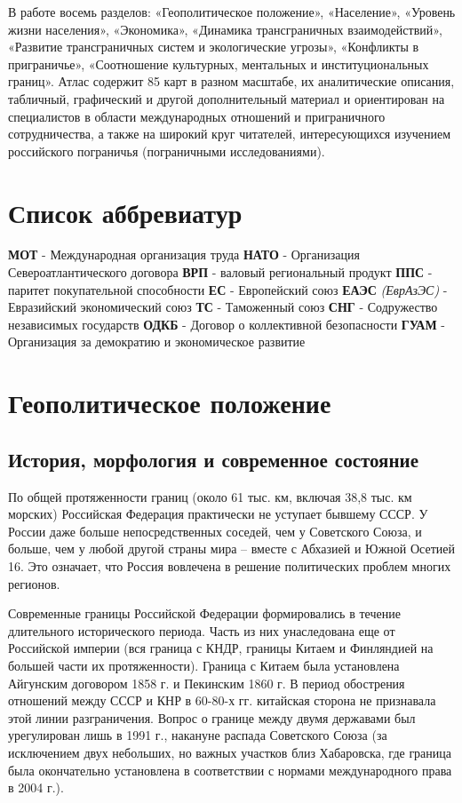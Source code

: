 \documentclass[]{book}
\begin{document}
В работе восемь разделов: «Геополитическое положение», «Население»,
«Уровень жизни населения», «Экономика», «Динамика трансграничных
взаимодействий», «Развитие трансграничных систем и экологические
угрозы», «Конфликты в приграничье», «Соотношение культурных, ментальных
и институциональных границ». Атлас содержит 85 карт в разном масштабе,
их аналитические описания, табличный, графический и другой
дополнительный материал и ориентирован на специалистов в области
международных отношений и приграничного сотрудничества, а также на
широкий круг читателей, интересующихся изучением российского пограничья
(пограничными исследованиями).

\chapter*{Список аббревиатур}\label{-}

\textbf{МОТ} - Международная организация труда \textbf{НАТО} -
Организация Североатлантического договора \textbf{ВРП} - валовый
региональный продукт \textbf{ППС} - паритет покупательной способности
\textbf{ЕС} - Европейский союз \textbf{ЕАЭС} \emph{(ЕврАзЭС)} -
Евразийский экономический союз \textbf{ТС} - Таможенный союз
\textbf{СНГ} - Содружество независимых государств \textbf{ОДКБ} -
Договор о коллективной безопасности \textbf{ГУАМ} - Организация за
демократию и экономическое развитие

\chapter{Геополитическое положение}\label{geopol}

\section{История, морфология и современное состояние}\label{geopol-hist}

По общей протяженности границ (около 61 тыс. км, включая 38,8 тыс. км
морских) Российская Федерация практически не уступает бывшему СССР. У
России даже больше непосредственных соседей, чем у Советского Союза, и
больше, чем у любой другой страны мира -- вместе с Абхазией и Южной
Осетией 16. Это означает, что Россия вовлечена в решение политических
проблем многих регионов.

Современные границы Российской Федерации формировались в течение
длительного исторического периода. Часть из них унаследована еще от
Российской империи (вся граница с КНДР, границы Китаем и Финляндией на
большей части их протяженности). Граница с Китаем была установлена
Айгунским договором 1858 г. и Пекинским 1860 г. В период обострения
отношений между СССР и КНР в 60-80-х гг. китайская сторона не признавала
этой линии разграничения. Вопрос о границе между двумя державами был
урегулирован лишь в 1991 г., накануне распада Советского Союза (за
исключением двух небольших, но важных участков близ Хабаровска, где
граница была окончательно установлена в соответствии с нормами
международного права в 2004 г.).
\end{document}
